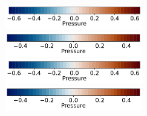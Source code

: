 \documentclass[12pt]{article}
\numberwithin{equation}{subsection}
\begin{document}
\begin{figure}[!htb]
\begin{multicols}{4}
	\end{multicols}
	\vspace{-0.3in}
	\begin{multicols}{4}
		\hspace{0.2in} \includegraphics[width=6cm]{./case1/p_ana_cbhorz.pdf}\par
		\hspace{0.95in} \includegraphics[width=6cm]{./case2/p_ana_cbhorz.pdf}\par
		\hspace{1.8in} \includegraphics[width=6cm]{./case3/p_ana_cbhorz.pdf}\par
		\hspace{2.45in} \includegraphics[width=6cm]{./case4/p_ana_cbhorz.pdf}
	\end{multicols}
	
\end{figure}
\end{document}
